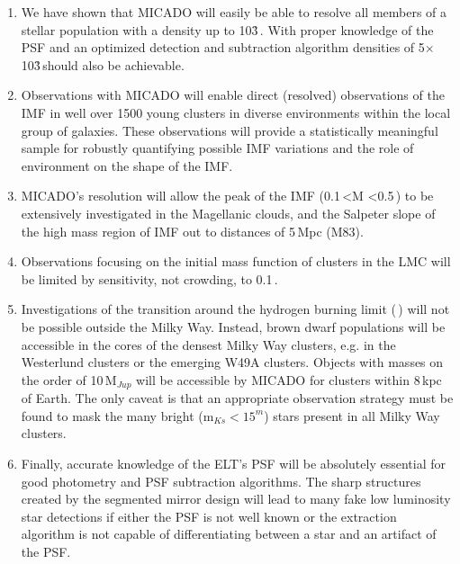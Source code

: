 \begin{enumerate}
    \item We have shown that MICADO will easily be able to resolve all members of a stellar population with a density up to 10\h3\,\spa. With proper knowledge of the PSF and an optimized detection and subtraction algorithm densities of 5$\times$10\h3\,\spa should also be achievable.
    
    \item Observations with MICADO will enable direct (resolved) observations of the IMF in well over 1500 young clusters in diverse environments within the local group of galaxies. These observations will provide a statistically meaningful sample for robustly quantifying possible IMF variations and the role of environment on the shape of the IMF.

    
    \item MICADO's resolution will allow the peak of the IMF (0.1\,\msun\textless M \textless0.5\,\msune) to be extensively investigated in the Magellanic clouds, and the Salpeter slope of the high mass region of IMF out to distances of 5\,Mpc (M83).
    
    \item Observations focusing on the initial mass function of clusters in the LMC will be limited by sensitivity, not crowding, to 0.1\,\msun. 
    
    \item Investigations of the transition around the hydrogen burning limit (\,\msun) will not be possible outside the Milky Way. Instead, brown dwarf populations will be accessible in the cores of the densest Milky Way clusters, e.g. in the Westerlund clusters or the emerging W49A clusters. Objects with masses on the order of 10\,M$_{Jup}$ will be accessible by MICADO for clusters within 8\,kpc of Earth. The only caveat is that an appropriate observation strategy must be found to mask the many bright (m$_{Ks}<15^m$) stars present in all Milky Way clusters.    
    
    \item Finally, accurate knowledge of the ELT's PSF will be absolutely essential for good photometry and PSF subtraction algorithms. The sharp structures created by the segmented mirror design will lead to many fake low luminosity star detections if either the PSF is not well known or the extraction algorithm is not capable of differentiating between a star and an artifact of the PSF.
    
\end{enumerate}


